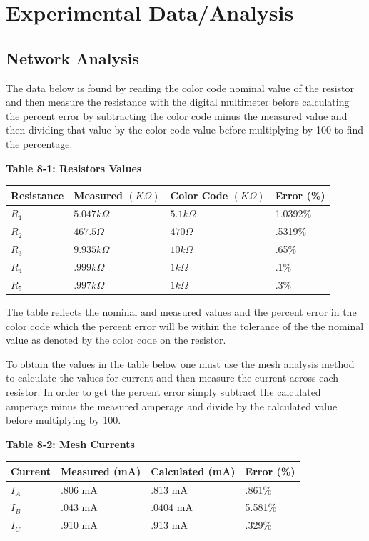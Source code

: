 \documentclass[a4paper]{article}
\begin{document}
\section{Experimental Data/Analysis}

\subsection{Network Analysis}

The data below is found by reading the color code nominal value of the resistor and then measure the resistance with the digital multimeter before calculating the percent error 
by subtracting the color code minus the measured value and then dividing that value by the color code value before multiplying by 100 to find the percentage.  

\begin{center}
    \small\textbf{Table 8-1: Resistors Values}
    \begin{tabular}{|p{3 cm}|p{3cm}|p{3 cm}|p{3 cm}|}
        \hline
        Resistance & Measured $(K\Omega)$ & Color Code $(K\Omega)$ & Error (\%) \\
        \hline
        $R_{1}$ & $5.047 k\Omega$ & $5.1k\Omega$ & 1.0392\% \\
        \hline
        $R_{2}$ & $467.5 \Omega$ & $470\Omega$& .5319\% \\
        \hline
        $R_{3}$ & $9.935 k\Omega$ & $10 k\Omega$& .65\% \\
        \hline
        $R_{4}$ & $.999 k\Omega$ & $1 k\Omega$& .1\% \\
        \hline
        $R_{5}$ & $.997 k\Omega$ & $1 k\Omega$ & .3\% \\
        \hline
    \end{tabular}
\end{center}

The table reflects the nominal and measured values and the percent error in the color code which the percent error will be within the tolerance of the the nominal value as denoted by
the color code on the resistor.

To obtain the values in the table below one must use the mesh analysis method to calculate the values for current and then measure the current across each resistor. In order to get the 
percent error simply subtract the calculated amperage minus the measured amperage and divide by the calculated value before multiplying by 100.

\begin{center}
    \small\textbf{Table 8-2: Mesh Currents}
    \begin{tabular}{|p{3 cm}|p{3cm}|p{3 cm}|p{3 cm}|}
        \hline
        Current & Measured (mA) & Calculated (mA) & Error (\%) \\
        \hline
        $I_{A}$ & .806 mA & .813 mA & .861\%  \\
        \hline
        $I_{B}$ & .043 mA & .0404 mA & 5.581\% \\
        \hline
        $I_{C}$ & .910 mA & .913 mA & .329\% \\
        \hline
    \end{tabular}
\end{center}
\end{document}
